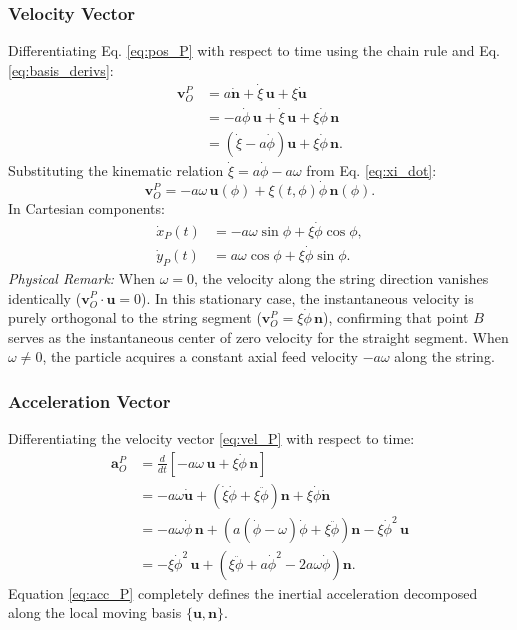 \documentclass[11pt,a4paper]{article}
\begin{document}
\subsubsection{Velocity Vector}
Differentiating Eq. \eqref{eq:pos_P} with respect to time using the chain rule and Eq. \eqref{eq:basis_derivs}:
\begin{align}
    \mathbf{v}_O^P &= a\dot{\mathbf{n}} + \dot{\xi}\,\mathbf{u} + \xi\dot{\mathbf{u}} \nonumber \\
    &= -a\dot{\phi}\,\mathbf{u} + \dot{\xi}\,\mathbf{u} + \xi\dot{\phi}\,\mathbf{n} \nonumber \\
    &= \left(\dot{\xi} - a\dot{\phi}\right)\mathbf{u} + \xi\dot{\phi}\,\mathbf{n}.
\end{align}
Substituting the kinematic relation $\dot{\xi} = a\dot{\phi} - a\omega$ from Eq. \eqref{eq:xi_dot}:
\begin{equation}
    \label{eq:vel_P}
    \mathbf{v}_O^P = -a\omega\,\mathbf{u}(\phi) + \xi(t, \phi)\dot{\phi}\,\mathbf{n}(\phi).
\end{equation}
In Cartesian components:
\begin{align}
    \dot{x}_P(t) &= -a\omega\sin\phi + \xi\dot{\phi}\cos\phi, \\
    \dot{y}_P(t) &= a\omega\cos\phi + \xi\dot{\phi}\sin\phi.
\end{align}
\noindent\textit{Physical Remark:} When $\omega = 0$, the velocity along the string direction vanishes identically ($\mathbf{v}_O^P \cdot \mathbf{u} = 0$). In this stationary case, the instantaneous velocity is purely orthogonal to the string segment ($\mathbf{v}_O^P = \xi\dot{\phi}\,\mathbf{n}$), confirming that point $B$ serves as the instantaneous center of zero velocity for the straight segment. When $\omega \neq 0$, the particle acquires a constant axial feed velocity $-a\omega$ along the string.

\subsubsection{Acceleration Vector}
Differentiating the velocity vector \eqref{eq:vel_P} with respect to time:
\begin{align}
    \mathbf{a}_O^P &= \frac{d}{dt}\left[-a\omega\,\mathbf{u} + \xi\dot{\phi}\,\mathbf{n}\right] \nonumber \\
    &= -a\omega\dot{\mathbf{u}} + \left(\dot{\xi}\dot{\phi} + \xi\ddot{\phi}\right)\mathbf{n} + \xi\dot{\phi}\dot{\mathbf{n}} \nonumber \\
    &= -a\omega\dot{\phi}\,\mathbf{n} + \left(a(\dot{\phi} - \omega)\dot{\phi} + \xi\ddot{\phi}\right)\mathbf{n} - \xi\dot{\phi}^2\,\mathbf{u} \nonumber \\
    &= -\xi\dot{\phi}^2\,\mathbf{u} + \left(\xi\ddot{\phi} + a\dot{\phi}^2 - 2a\omega\dot{\phi}\right)\mathbf{n}.
    \label{eq:acc_P}
\end{align}
Equation \eqref{eq:acc_P} completely defines the inertial acceleration decomposed along the local moving basis $\{\mathbf{u}, \mathbf{n}\}$.
\end{document}
